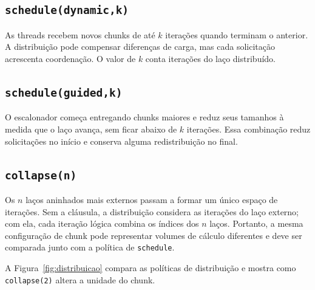 \documentclass[11pt,letterpaper]{article}
\begin{document}
\subsection{\texttt{schedule(dynamic,k)}}
As threads recebem novos chunks de até $k$ iterações quando terminam o anterior. A distribuição pode compensar diferenças de carga, mas cada solicitação acrescenta coordenação. O valor de $k$ conta iterações do laço distribuído.

\subsection{\texttt{schedule(guided,k)}}
O escalonador começa entregando chunks maiores e reduz seus tamanhos à medida que o laço avança, sem ficar abaixo de $k$ iterações. Essa combinação reduz solicitações no início e conserva alguma redistribuição no final.

\subsection{\texttt{collapse(n)}}
Os $n$ laços aninhados mais externos passam a formar um único espaço de iterações. Sem a cláusula, a distribuição considera as iterações do laço externo; com ela, cada iteração lógica combina os índices dos $n$ laços. Portanto, a mesma configuração de chunk pode representar volumes de cálculo diferentes e deve ser comparada junto com a política de \texttt{schedule}.

A Figura~\ref{fig:distribuicao} compara as políticas de distribuição e mostra como
\texttt{collapse(2)} altera a unidade do chunk.
\end{document}

